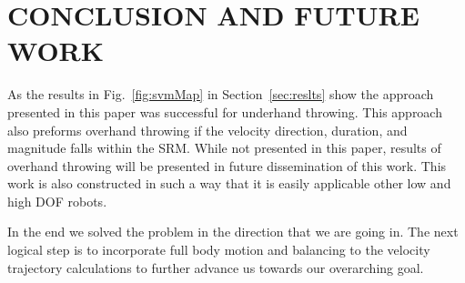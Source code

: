 \section{CONCLUSION AND FUTURE WORK}\label{sec:conc}

As the results in Fig.~\ref{fig:svmMap} in Section~\ref{sec:reslts} show the approach presented in this paper was successful for underhand throwing.  This approach also preforms overhand throwing if the velocity direction, duration, and magnitude falls within the SRM.  While not presented in this paper, results of overhand throwing will be presented in future dissemination of this work.  This work is also constructed in such a way that it is easily applicable other low and high DOF robots.

In the end we solved the problem in the direction that we are going in.  The next logical step is to incorporate full body motion and balancing to the velocity trajectory calculations to further advance us towards our overarching goal.


